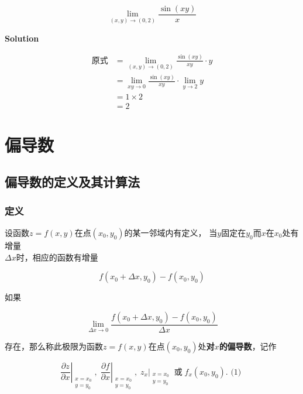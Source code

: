 \documentclass[12pt, a4paper]{article}
\numberwithin{equation}{section}
\begin{document}
    $$
        \lim_{\left(x,y\right) \rightarrow \left(0,2\right)} \frac{\sin\left(xy\right)}{x}
    $$
    \vspace{1em}

    \textbf{Solution}
    \vspace{1em}

    \begin{align*}
        \text{原式} &= \lim_{\left(x,y\right) \rightarrow \left(0,2\right)} \frac{\sin\left(xy\right)}{xy} \cdot y \\
        &=\lim_{xy \rightarrow 0} \frac{\sin\left(xy\right)}{xy} \cdot \lim_{y\rightarrow 2}y \\
        &= 1 \times 2 \\
        &= 2
    \end{align*}

\section{偏导数}

\subsection{偏导数的定义及其计算法}

\subsubsection{定义}

    设函数\(z=f\left(x,y\right)\)在点\(\left(x_0,y_0\right)\)的某一邻域内有定义，
    当\(y\)固定在\(y_0\)而\(x\)在\(x_0\)处有增量\\ \(\Delta x\)时，相应的函数有增量

    $$
        f\left(x_0+\Delta x, y_0\right)-f\left(x_0, y_0\right)
    $$

    如果

    \begin{equation}
        \lim _{\Delta x \rightarrow 0} \frac{f\left(x_0+\Delta x, y_0\right)-f\left(x_0, y_0\right)}{\Delta x}
        \label{9-4-1}
    \end{equation}

    存在，那么称此极限为函数\(z=f\left(x,y\right)\)在点\(\left(x_0,y_0\right)\)处\textbf{对\(x\)的偏导数}，记作

    $$
        \left.\frac{\partial z}{\partial x}\right|_{\substack{x=x_0 \\ y=y_0}},\;
        \left.\frac{\partial f}{\partial x}\right|_{\substack{x=x_0 \\ y=y_0}},\;
        \left.z_x\right|_{\substack{x=x_0 \\ y=y_0}}\; \text{或}\;
        f_x\left(x_0, y_0\right) \text {. (1) }
    $$
\end{document}
